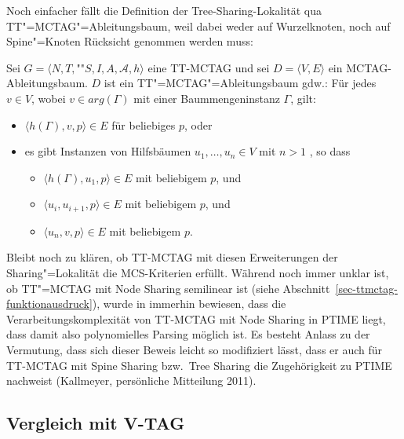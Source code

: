 Noch einfacher fällt die Definition der Tree-Sharing-Lokalität qua TT"=MCTAG"=Ableitungsbaum, weil dabei weder auf Wurzelknoten, noch auf Spine"=Knoten Rücksicht genommen werden muss:
\begin{definition}
Sei $G = \langle N,T,$""$S,I,A,\mathcal{A},h \rangle$ eine TT-MCTAG und sei $D = \langle V,E \rangle$ ein MCTAG-Ableitungsbaum. $D$ ist ein TT"=MCTAG"=Ableitungsbaum gdw.:
Für jedes $v \in V$, wobei $v \in arg(\Gamma)$ mit einer Baummengeninstanz $\Gamma$, gilt:
\begin{itemize} 
  \item $\langle h(\Gamma),v,p \rangle \in E$ für beliebiges $p$, oder
  \item es gibt Instanzen von Hilfsbäumen $u_1, \ldots, u_n \in V$ mit $n>1$ , so dass
  \begin{itemize}
    \item $\langle h(\Gamma),u_1,p \rangle \in E$ mit beliebigem $p$, und
    \item $\langle u_i,u_{i+1},p \rangle \in E$ mit beliebigem $p$, und
    \item $\langle u_n,v,p \rangle \in E$ mit beliebigem $p$.
  \end{itemize}
\end{itemize}  
\end{definition}

Bleibt noch zu klären, ob TT-MCTAG mit diesen Erweiterungen der Sharing"=Lokalität die MCS-Kriterien erfüllt. Während noch immer unklar ist, ob TT"=MCTAG mit Node Sharing semilinear ist (siehe Abschnitt~\ref{sec-ttmctag-funktionausdruck}), wurde in \cite{Kallmeyer:Satta:09} immerhin bewiesen, dass die Verarbeitungskomplexität von TT-MCTAG mit Node Sharing in PTIME liegt, dass damit also polynomielles Parsing möglich ist. Es besteht Anlass zu der Vermutung, dass sich dieser Beweis leicht so modifiziert lässt, dass er auch für TT-MCTAG mit Spine Sharing bzw.\ Tree Sharing die Zugehörigkeit zu PTIME nachweist (Kallmeyer, persönliche Mitteilung 2011).%





\subsection{Vergleich mit V-TAG}

